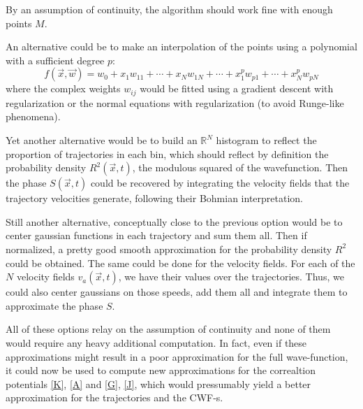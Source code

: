 \documentclass[11pt, a4paper]{article} %
\newcommand{\R}{\mathbb{R}} %
\begin{document}
By an assumption of continuity, the algorithm should work fine with enough points $M$.

An alternative could be to make an interpolation of the points using a polynomial with a sufficient degree $p$: $$f(\vec{x},\vec{w})=w_0+x_1w_{11}+\cdots+x_Nw_{1N}+\cdots+x_1^pw_{p1}+\cdots+x_N^pw_{pN}$$
where the complex weights $w_{ij}$ would be fitted using a gradient descent with regularization or the normal equations with regularization (to avoid Runge-like phenomena).


Yet another alternative would be to build an $\R^N$ histogram to reflect the proportion of trajectories in each bin, which should reflect by definition the probability density $R^2(\vec{x},t)$, the modulous squared of the wavefunction. Then the phase $S(\vec{x},t)$ could be recovered by integrating the velocity fields that the trajectory velocities generate, following their Bohmian interpretation.


Still another alternative, conceptually close to the previous option would be to center gaussian functions in each trajectory and sum them all. Then if normalized, a pretty good smooth approximation for the probability density $R^2$ could be obtained. The same could be done for the velocity fields. For each of the $N$ velocity fields $v_a(\vec{x},t)$, we have their values over the trajectories. Thus, we could also center gaussians on those speeds, add them all and integrate them to approximate the phase $S$.

All of these options relay on the assumption of continuity and none of them would require any heavy additional computation. In fact, even if these approximations might result in a poor approximation for the full wave-function, it could now be used to compute new approximations for the correaltion potentials \ref{K}, \ref{A} and \ref{G}, \ref{J}, which would pressumably yield a better approximation for the trajectories and the CWF-s. 
\end{document}
